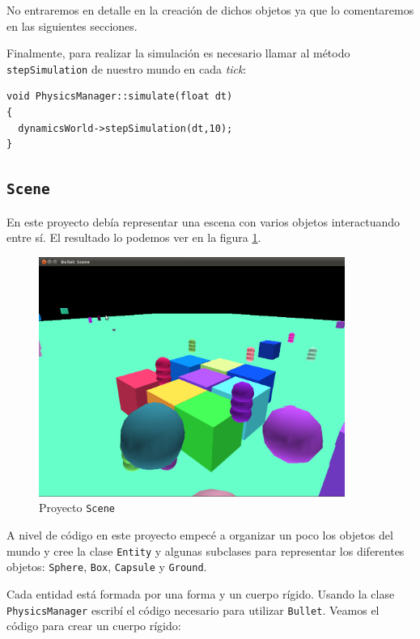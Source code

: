 \documentclass[12pt]{article}
\begin{document}
No entraremos en detalle en la creación de dichos objetos ya que lo comentaremos en las siguientes secciones.

Finalmente, para realizar la simulación es necesario llamar al método \texttt{stepSimulation} de nuestro mundo en cada \textit{tick}:

{\scriptsize
\begin{verbatim}
void PhysicsManager::simulate(float dt)
{
  dynamicsWorld->stepSimulation(dt,10);
}
\end{verbatim}
}

\subsection{\texttt{Scene}}

En este proyecto debía representar una escena con varios objetos interactuando entre sí. El resultado lo podemos ver en la figura \ref{fig:scene}.

\begin{figure}[h]
\begin{center}
 \includegraphics[width=10cm]{figures/scene.png}
 \caption{Proyecto \texttt{Scene}}
 \label{fig:scene}
\end{center}
\end{figure}

A nivel de código en este proyecto empecé a organizar un poco los objetos del mundo y cree la clase \texttt{Entity} y algunas subclases para representar los diferentes objetos: \texttt{Sphere}, \texttt{Box}, \texttt{Capsule} y \texttt{Ground}.

Cada entidad está formada por una forma y un cuerpo rígido. Usando la clase \texttt{PhysicsManager} escribí el código necesario para utilizar \texttt{Bullet}. Veamos el código para crear un cuerpo rígido:
\end{document}
